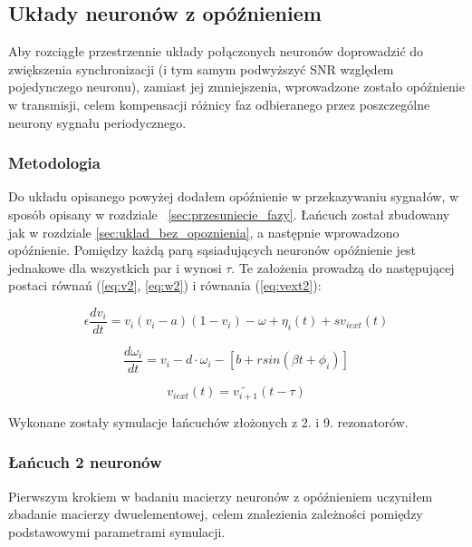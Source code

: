   \subsection{Układy neuronów z opóźnieniem}

  Aby rozciągłe przestrzennie układy połączonych neuronów doprowadzić do zwiększenia synchronizacji (i tym samym podwyższyć SNR względem pojedynczego neuronu), zamiast jej zmniejszenia, wprowadzone zostało opóźnienie w transmisji, celem kompensacji różnicy faz odbieranego przez poszczególne neurony sygnału periodycznego.

  \subsubsection{Metodologia}
  
  Do układu opisanego powyżej dodałem opóźnienie w przekazywaniu sygnałów, w sposób opisany w rozdziale ~\ref{sec:przesuniecie_fazy}. Łańcuch został zbudowany jak w rozdziale \ref{sec:uklad_bez_opoznienia}, a następnie wprowadzono opóźnienie. Pomiędzy każdą parą sąsiadujących neuronów opóźnienie jest jednakowe dla wszystkich par i wynosi $\tau$. Te założenia prowadzą do następującej postaci równań (\ref{eq:v2}, \ref{eq:w2}) i równania (\ref{eq:vext2}):

  \begin{equation}
    \epsilon \frac{dv_i}{dt} = v_i(v_i-a)(1-v_i)- \omega  + \eta_i(t) + sv_{iext}(t)
  \end{equation}

  \begin{equation}
    \frac{d \omega_i}{dt} = v_i - d \cdot \omega_i - [b + r sin(\beta t + \phi_i)]
  \end{equation}

  \begin{equation}
    v_{i ext}(t) = \widetilde{v_{i+1}}(t-\tau)
  \end{equation}

  Wykonane zostały symulacje łańcuchów złożonych z 2. i 9. rezonatorów.
  
  \subsubsection{Łańcuch 2 neuronów}

  Pierwszym krokiem w badaniu macierzy neuronów z opóźnieniem uczyniłem zbadanie macierzy dwuelementowej, celem znalezienia zależności pomiędzy podstawowymi parametrami symulacji.

